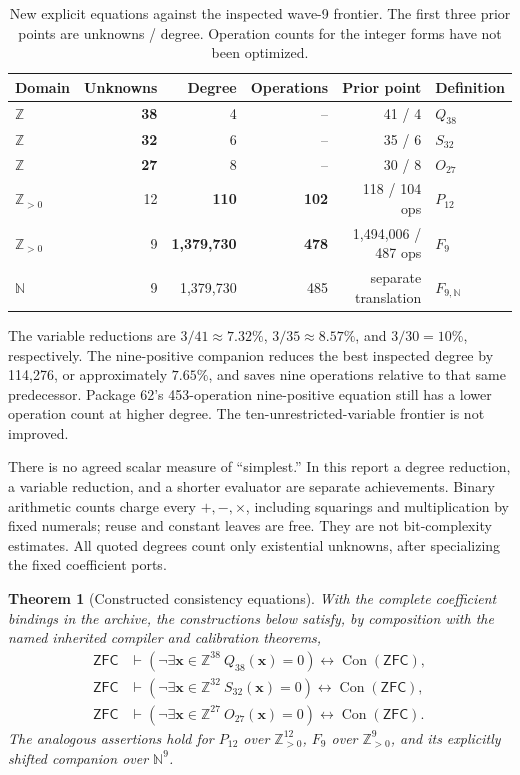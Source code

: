 \documentclass[11pt]{article}
\newtheorem{theorem}{Theorem}[section]
\theoremstyle{definition}\newtheorem{definition}[theorem]{Definition}
\theoremstyle{remark}\newtheorem{remark}[theorem]{Remark}
\newcommand{\Z}{\mathbb Z}
\newcommand{\N}{\mathbb N}
\newcommand{\Con}{\operatorname{Con}}
\newcommand{\ZFC}{\mathsf{ZFC}}
\begin{document}
\begin{table}[ht]
\centering\small
\begin{tabular}{@{}lrrrrl@{}}
\toprule
Domain & Unknowns & Degree & Operations & Prior point & Definition\\
\midrule
$\Z$ & \textbf{38} & 4 & -- & 41 / 4 & $Q_{38}$\\
$\Z$ & \textbf{32} & 6 & -- & 35 / 6 & $S_{32}$\\
$\Z$ & \textbf{27} & 8 & -- & 30 / 8 & $O_{27}$\\
$\Z_{>0}$ & 12 & \textbf{110} & \textbf{102} & 118 / 104 ops & $P_{12}$\\
$\Z_{>0}$ & 9 & \textbf{1,379,730} & \textbf{478} & 1,494,006 / 487 ops & $F_9$\\
$\N$ & 9 & 1,379,730 & 485 & separate translation & $F_{9,\N}$\\
\bottomrule
\end{tabular}
\caption{New explicit equations against the inspected wave-9 frontier.
The first three prior points are unknowns / degree. Operation counts for
the integer forms have not been optimized.}\label{tab:frontier}
\end{table}

The variable reductions are $3/41\approx7.32\%$, $3/35\approx8.57\%$, and
$3/30=10\%$, respectively. The nine-positive companion reduces the best
inspected degree by 114,276, or approximately $7.65\%$, and saves nine
operations relative to that same predecessor. Package 62's 453-operation
nine-positive equation still has a lower operation count at higher degree.
The ten-unrestricted-variable frontier is not improved.

There is no agreed scalar measure of ``simplest.'' In this report a degree
reduction, a variable reduction, and a shorter evaluator are separate
achievements. Binary arithmetic counts charge every $+,-,\times$, including
squarings and multiplication by fixed numerals; reuse and constant leaves
are free. They are not bit-complexity estimates. All quoted degrees count
only existential unknowns, after specializing the fixed coefficient ports.

\begin{theorem}[Constructed consistency equations]\label{thm:main}
With the complete coefficient bindings in the archive, the constructions
below satisfy, by composition with the named inherited compiler and
calibration theorems,
\begin{align*}
 \ZFC&\vdash (\neg\exists\mathbf x\in\Z^{38}\ Q_{38}(\mathbf x)=0)
                      \leftrightarrow\Con(\ZFC),\\
 \ZFC&\vdash (\neg\exists\mathbf x\in\Z^{32}\ S_{32}(\mathbf x)=0)
                      \leftrightarrow\Con(\ZFC),\\
 \ZFC&\vdash (\neg\exists\mathbf x\in\Z^{27}\ O_{27}(\mathbf x)=0)
                      \leftrightarrow\Con(\ZFC).
\end{align*}
The analogous assertions hold for $P_{12}$ over $\Z_{>0}^{12}$, $F_9$ over
$\Z_{>0}^9$, and its explicitly shifted companion over $\N^9$.
\end{theorem}
\end{document}
